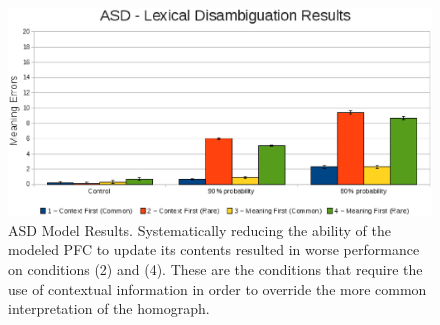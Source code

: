 \begin{figure}[tp]
\begin{center}
	\includegraphics[width=140mm]{graphs/asd_lexamb_results.eps}
\end{center}
\caption{ASD Model Results. Systematically reducing the ability of the modeled PFC to update its contents resulted in worse performance on conditions (2) and (4).  These are the conditions that require the use of contextual information in order to override the more common interpretation of the homograph. } 
\label{ASD-Amb-Results}
\end{figure} 


